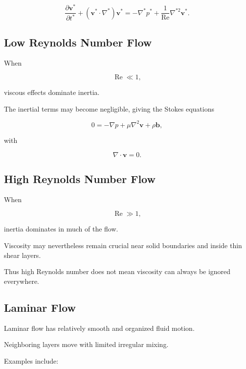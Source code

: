 \[
\boxed{
\frac{\partial\mathbf{v}^*}{\partial t^*}
+
(\mathbf{v}^*\cdot\nabla^*)\mathbf{v}^*
=
-\nabla^*p^*
+
\frac{1}{\operatorname{Re}}
\nabla^{*2}\mathbf{v}^*.
}
\]

\subsection{Low Reynolds Number Flow}
\label{subsec:low-reynolds-flow}

When

\[
\operatorname{Re}\ll1,
\]

viscous effects dominate inertia.

The inertial terms may become negligible, giving the Stokes equations

\[
\boxed{
0
=
-\nabla p
+
\mu\nabla^2\mathbf{v}
+
\rho\mathbf{b},
}
\]

with

\[
\boxed{
\nabla\cdot\mathbf{v}=0.
}
\]

\subsection{High Reynolds Number Flow}
\label{subsec:high-reynolds-flow}

When

\[
\operatorname{Re}\gg1,
\]

inertia dominates in much of the flow.

Viscosity may nevertheless remain crucial near solid boundaries and inside
thin shear layers.

Thus high Reynolds number does not mean viscosity can always be ignored
everywhere.

\subsection{Laminar Flow}
\label{subsec:laminar-flow}

Laminar flow has relatively smooth and organized fluid motion.

Neighboring layers move with limited irregular mixing.

Examples include:

